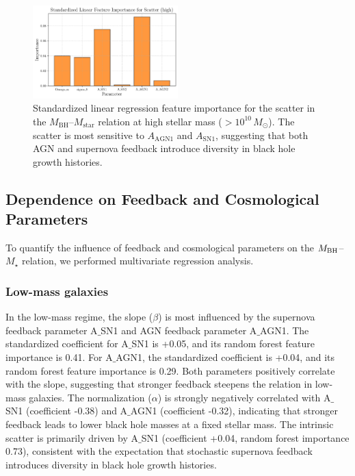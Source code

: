 \documentclass[twocolumn]{aastex631}
\begin{document}
\begin{figure}[ht!]
    \centering
    \includegraphics[width=0.5\textwidth]{plots/featimp_StandardizedLinear_Scatter_high_118_20250423_182621.png}
    \caption{Standardized linear regression feature importance for the scatter in the $M_\mathrm{BH}$--$M_\mathrm{star}$ relation at high stellar mass ($>10^{10}\,M_\odot$). The scatter is most sensitive to $A_\mathrm{AGN1}$ and $A_\mathrm{SN1}$, suggesting that both AGN and supernova feedback introduce diversity in black hole growth histories.
}
    \label{fig:featimp_scatter_linear_high}
\end{figure}

\subsection{Dependence on Feedback and Cosmological Parameters}

To quantify the influence of feedback and cosmological parameters on the $M_{\rm BH}$--$M_{\star}$ relation, we performed multivariate regression analysis.

\subsubsection{Low-mass galaxies}

In the low-mass regime, the slope ($\beta$) is most influenced by the supernova feedback parameter A\ensuremath{\_}{SN1} and AGN feedback parameter A\ensuremath{\_}{AGN1}. The standardized coefficient for A\ensuremath{\_}{SN1} is +0.05, and its random forest feature importance is 0.41. For A\ensuremath{\_}{AGN1}, the standardized coefficient is +0.04, and its random forest feature importance is 0.29. Both parameters positively correlate with the slope, suggesting that stronger feedback steepens the relation in low-mass galaxies. The normalization ($\alpha$) is strongly negatively correlated with A\ensuremath{\_}{SN1} (coefficient -0.38) and A\ensuremath{\_}{AGN1} (coefficient -0.32), indicating that stronger feedback leads to lower black hole masses at a fixed stellar mass. The intrinsic scatter is primarily driven by A\ensuremath{\_}{SN1} (coefficient +0.04, random forest importance 0.73), consistent with the expectation that stochastic supernova feedback introduces diversity in black hole growth histories.
\end{document}
